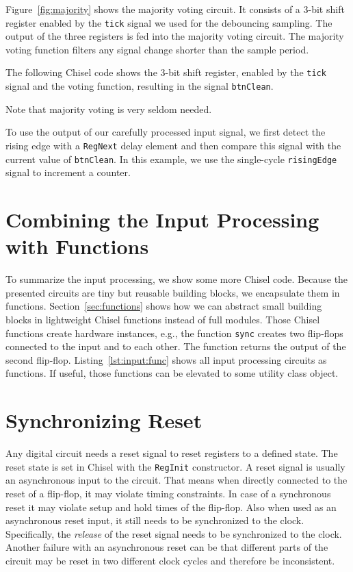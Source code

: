 \documentclass[%
    10pt,
    headinclude, footexclude,
    openright, %
    notitlepage,
    cleardoubleempty,
    headsepline,
    pointlessnumbers,
    bibtotoc, idxtotoc,
    ]{scrbook}
\newcommand{\code}[1]{{\lstinline[basicstyle=\small\ttfamily]{#1}}}
\begin{document}
Figure~\ref{fig:majority} shows the majority voting circuit.
It consists of a 3-bit shift register enabled by the \code{tick} signal
we used for the debouncing sampling. The output of the three registers
is fed into the majority voting circuit. The majority voting function filters
any signal change shorter than the sample period.

The following Chisel code shows the 3-bit shift register, enabled by the
\code{tick} signal and the voting function, resulting in the signal \code{btnClean}.

Note that majority voting is very seldom needed.


To use the output of our carefully processed input signal, we first detect
the rising edge with a \code{RegNext} delay element and then compare this
signal with the current value of \code{btnClean}. In this example, we use
the single-cycle \code{risingEdge} signal to increment a counter.



\section{Combining the Input Processing with Functions}

To summarize the input processing, we show some more Chisel code.
Because the presented circuits are tiny but reusable building blocks, we encapsulate
them in functions. Section~\ref{sec:functions} shows how we can abstract
small building blocks in lightweight Chisel functions instead of full modules.
Those Chisel functions create hardware instances, e.g., the function
\code{sync} creates two flip-flops connected to the input and to each other.
The function returns the output of the second flip-flop.
Listing~\ref{lst:input:func} shows all input processing circuits as functions.
If useful, those functions can be elevated to some utility class object.


\section{Synchronizing Reset}

Any digital circuit needs a reset signal to reset registers to a defined state. The reset state is
set in Chisel with the \code{RegInit} constructor. A reset signal is usually an asynchronous
input to the circuit. That means when directly connected to the reset of a flip-flop, it may
violate timing constraints. In case of a synchronous reset it may violate setup and hold times
of the flip-flop. Also when used as an asynchronous reset input, it still needs to be synchronized
to the clock. Specifically, the \emph{release} of the reset signal needs to be synchronized to the clock.
Another failure with an asynchronous reset can be that different parts of the circuit may be
reset in two different clock cycles and therefore be inconsistent.
\end{document}
